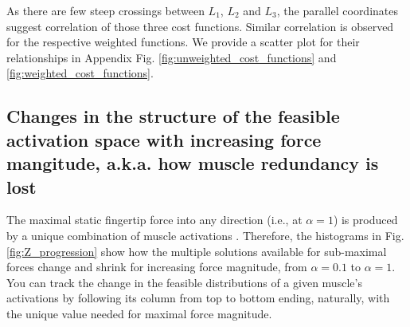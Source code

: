 As there are few steep crossings between $L_1$, $L_2$ and $L_3$, the parallel coordinates suggest correlation of those three cost functions.
Similar correlation is observed for the respective weighted functions.
We provide a scatter plot for their relationships in Appendix Fig. \ref{fig:unweighted_cost_functions} and \ref{fig:weighted_cost_functions}.




\subsection*{Changes in the structure of the feasible activation space with increasing force mangitude, a.k.a. how muscle redundancy is lost} %
\label{sub:activation_spaces_for_increasing_force}
The maximal static fingertip force into any direction (i.e., at $\alpha=1$) is produced by  a unique combination of muscle activations \cite{spoor1983balancing,Chao1978Graphical,valero-cuevas2015fundamentals}. Therefore, the histograms in Fig. \ref{fig:Z_progression} show how the multiple solutions available for sub-maximal forces change and shrink  for increasing force magnitude, from $\alpha=0.1$  to $\alpha=1$. You can track the change in the feasible distributions of a given muscle's activations by following its column from top to bottom ending, naturally, with the unique value needed for maximal force magnitude. 

